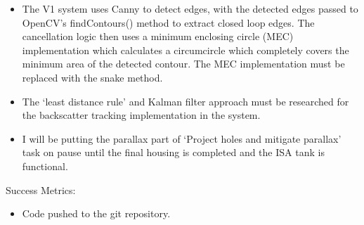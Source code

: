 \begin{itemize}
    \item The V1 system uses Canny to detect edges, with the detected edges passed to OpenCV's findContours() method to extract closed loop edges. The cancellation logic then uses a minimum enclosing circle (MEC) implementation which calculates a circumcircle which completely covers the minimum area of the detected contour. The MEC implementation must be replaced with the snake method.
    \item The `least distance rule' and Kalman filter approach must be researched for the backscatter tracking implementation in the system.
    \item I will be putting the parallax part of `Project holes and mitigate parallax' task on pause until the final housing is completed and the ISA tank is functional.
\end{itemize}

Success Metrics:

\begin{itemize}
    \item Code pushed to the git repository.
\end{itemize}
